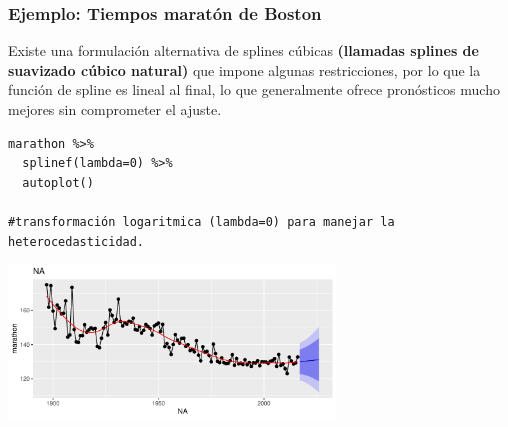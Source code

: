 \documentclass[10pt]{beamer}
\begin{document}





\begin{frame}[fragile]
\frametitle{Ejemplo: Tiempos maratón de Boston}


\small Existe una formulación alternativa de splines cúbicas \textbf{(llamadas splines de suavizado cúbico natural)} que impone algunas restricciones, por lo que la función de spline es lineal al final, lo que generalmente ofrece pronósticos mucho mejores sin comprometer el ajuste.



\lstset{language=r,label= ,caption= ,captionpos=b,numbers=none}
\begin{lstlisting}
marathon %>%
  splinef(lambda=0) %>% 
  autoplot()
  
#transformación logaritmica (lambda=0) para manejar la heterocedasticidad.

\end{lstlisting}

\pause

\begin{center}
\includegraphics[width=0.65\textwidth]{5-regression_files/figure-beamer/unnamed-chunk-16-1.pdf}
\end{center} 



\end{frame}


\end{document}
